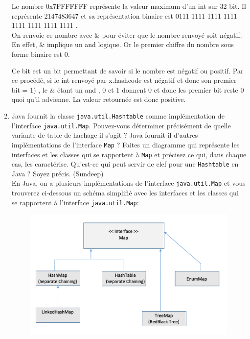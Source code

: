 \documentclass[11pt]{article}
\begin{document}
\begin{enumerate}
Le nombre 0x7FFFFFFF représente la valeur maximum d'un int sur 32 bit. Il représente 2147483647 et sa représentation binaire est  0111 1111 1111 1111 1111 1111 1111 1111 . \\ On renvoie ce nombre avec \& pour éviter que le nombre renvoyé soit négatif. En effet, \& implique un and logique. Or le premier chiffre du nombre sous forme binaire est 0.

Ce bit est un bit permettant de savoir si le nombre est négatif ou positif. Par ce procédé, si le int renvoyé par x.hashcode est négatif  et donc son premier bit = 1) , le \& étant un and , 0 et 1 donnent 0 et donc les premier bit reste 0 quoi qu'il advienne. La valeur retournée est donc positive.

\item Java fournit la classe \texttt{java.util.Hashtable} comme implémentation de l'interface \texttt{java.util.Map}. Pouvez-vous déterminer précisément de quelle variante de table de hachage il s'agit ? Java fournit-il d'autres implémentations de l'interface \texttt{Map} ? Faites un diagramme qui représente les interfaces et les classes qui se rapportent à \texttt{Map} et précisez ce qui, dans chaque cas, les caractérise. Qu'est-ce qui peut servir de clef pour une \texttt{Hashtable} en Java ? Soyez précis. (Sundeep) \\

En Java, on a plusieurs implémentations de l'interface \texttt{java.util.Map} et vous trouverez ci-dessous un schéma simplifié avec les interfaces et les classes qui se rapportent à l'interface \texttt{java.util.Map}:
\begin{figure} [!h]
\center
\includegraphics[scale=0.8]{diag.png}
\end{figure}


\end{enumerate}
\end{document}
